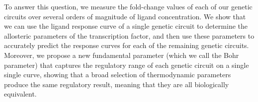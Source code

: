
To answer this question, we measure the fold-change values of each of our
genetic circuits over several orders of magnitude of ligand concentration. We
show that we can use the ligand response curve of a single genetic circuit to
determine the allosteric parameters of the transcription factor, and then use
these parameters to accurately predict the response curves for each of the
remaining genetic circuits. Moreover, we propose a new fundamental parameter
(which we call the Bohr parameter) that captures the regulatory range of each
genetic circuit on a single single curve, showing that a broad selection of
thermodynamic parameters produce the same regulatory result, meaning that they
are all biologically equivalent.



